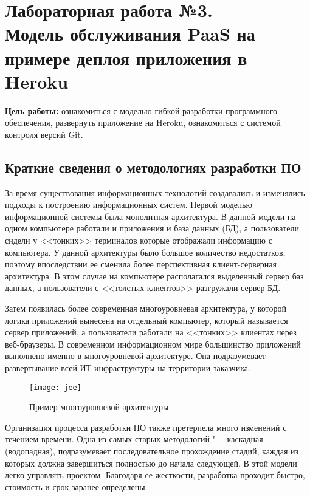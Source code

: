 \section[ЛР №3. Модель обслуживания PaaS, Heroku]{Лабораторная работа №3. \\
Модель обслуживания PaaS на примере деплоя приложения в Heroku}

\textbf{Цель работы:} ознакомиться с моделью гибкой разработки программного обеспечения, развернуть приложение на Heroku, ознакомиться с системой контроля версий Git.

\subsection{Краткие сведения о методологиях разработки ПО}
За время существования информационных технологий создавались и изменялись подходы к построению информационных систем.
Первой моделью информационной системы была монолитная архитектура.
В данной модели на одном компьютере работали и приложения и база данных (БД), а пользователи сидели у <<тонких>> терминалов которые отображали информацию с компьютера.
У данной архитектуры было большое количество недостатков, поэтому впоследствии ее сменила более перспективная клиент-серверная архитектура.
В этом случае на компьютере располагался выделенный сервер баз данных, а пользователи с <<толстых клиентов>> разгружали сервер БД.

Затем появилась более современная многоуровневая архитектура, у которой логика приложений вынесена на отдельный компьютер, который называется сервер приложений, а пользователи работали на <<тонких>> клиентах через веб-браузеры.
В современном информационном мире большинство приложений выполнено именно в многоуровневой архитектуре.
Она подразумевает развертывание всей ИТ-инфраструктуры на территории заказчика.

\begin{figure}[ht]
    \centering
	\texttt{[image: jee]}
	\caption{Пример многоуровневой архитектуры}\label{pic:jee}
\end{figure}

Организация процесса разработки ПО также претерпела много изменений с течением времени.
Одна из самых старых методологий "--- каскадная (водопадная), подразумевает последовательное прохождение стадий, каждая из которых должна завершиться полностью до начала следующей.
В этой модели легко управлять проектом.
Благодаря ее жесткости, разработка проходит быстро, стоимость и срок заранее определены.

